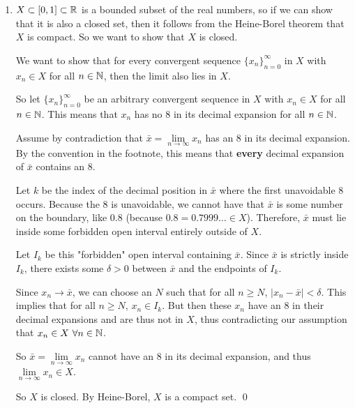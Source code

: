 \documentclass[12pt]{article}
\begin{document}
\begin{enumerate}
    Using the result from 8.1., we know that the Cartesian product of a Jordan null set with itself is also a Jordan null set. So $X \times X$ is a Jordan null set.

    Since every Jordan null set is also a Lebesgue null set, it follows that $X \times X$ is a Lebesgue null set.

    \item $X \subset [0, 1] \subset \mathbb{R}$ is a bounded subset of the real numbers, so if we can show that it is also a closed set, then it follows from the Heine-Borel theorem that $X$ is compact. So we want to show that $X$ is closed.
    
    We want to show that for every convergent sequence $\{x_n\}_{n = 0}^{\infty}$ in $X$ with $x_n \in X$ for all $n \in \mathbb{N}$, then the limit also lies in $X$.

    So let $\{x_n\}_{n = 0}^{\infty}$ be an arbitrary convergent sequence in $X$ with $x_n \in X$ for all $n \in \mathbb{N}$. This means that $x_n$ has no 8 in its decimal expansion for all $n \in \mathbb{N}$.

    Assume by contradiction that $\bar{x} = \lim\limits_{n \rightarrow \infty} x_n$ has an 8 in its decimal expansion. By the convention in the footnote, this means that \textbf{every} decimal expansion of $\bar{x}$ contains an 8.

    Let $k$ be the index of the decimal position in $\bar{x}$ where the first unavoidable 8 occurs. Because the 8 is unavoidable, we cannot have that $\bar{x}$ is some number on the boundary, like $0.8$ (because $0.8 = 0.7999\dots \in X$). Therefore, $\bar{x}$ must lie inside some forbidden open interval entirely outside of $X$.
    
    Let $I_k$ be this "forbidden" open interval containing $\bar{x}$. Since $\bar{x}$ is strictly inside $I_k$, there exists some $\delta > 0$ between $\bar{x}$ and the endpoints of $I_k$.

    Since $x_n \rightarrow \bar{x}$, we can choose an $N$ such that for all $n \geq N$, $|x_n - \bar{x}| < \delta$. This implies that for all $n \geq N$, $x_n \in I_k$. But then these $x_n$ have an 8 in their decimal expansions and are thus not in $X$, thus contradicting our assumption that $x_n \in X \ \forall n \in \mathbb{N}$.

    So $\bar{x} = \lim\limits_{n \rightarrow \infty} x_n$ cannot have an 8 in its decimal expansion, and thus $\lim\limits_{n \rightarrow \infty} x_n \in X$.

    So $X$ is closed. By Heine-Borel, $X$ is a compact set. \qed
\end{enumerate}
\end{document}
